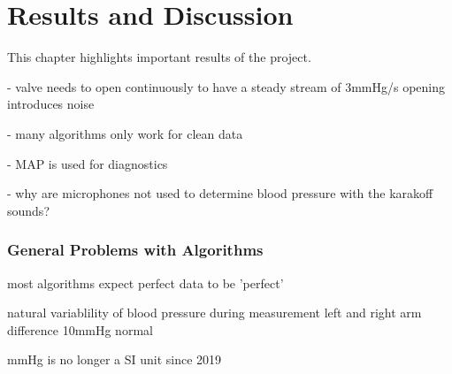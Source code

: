 \chapter{Results and Discussion}\label{cp:res}


This chapter highlights important results of the project.


- valve needs to open continuously to have a steady stream of 3mmHg/s
  opening introduces noise

- many algorithms only work for clean data

- MAP is used for diagnostics 

- why are microphones not used to determine blood pressure with the karakoff sounds?


\subsection{General Problems with Algorithms}
most algorithms expect perfect data to be 'perfect'

natural variablility of blood pressure during measurement
left and right arm difference 10mmHg normal


mmHg is no longer a SI unit since 2019